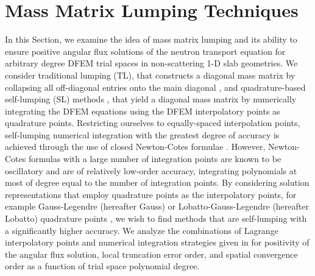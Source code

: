 \section{Mass Matrix Lumping Techniques}

In this Section, we examine the idea of mass matrix lumping and its ability to ensure positive angular flux solutions of the neutron transport equation for arbitrary degree DFEM trial spaces in non-scattering 1-D slab geometries.  
We consider traditional lumping (TL), that constructs a diagonal mass matrix by collapsing all off-diagonal entries onto the main diagonal \cite{adams}, and quadrature-based self-lumping (SL) methods \cite{raviart}, that yield a diagonal mass matrix by numerically integrating the DFEM equations using the DFEM interpolatory points as quadrature points.  
Restricting ourselves to equally-spaced interpolation points, self-lumping numerical integration with the greatest degree of accuracy is achieved through the use of closed Newton-Cotes formulae \cite{abramowitz}.  
However, Newton-Cotes formulas with a large number of integration points are known to be oscillatory and are of relatively low-order accuracy, integrating polynomials at most of degree equal to the number of integration points.
By considering solution representations that employ quadrature points as the interpolatory points, for example Gauss-Legendre (hereafter Gauss) or Lobatto-Gauss-Legendre (hereafter Lobatto) quadrature points \cite{abramowitz}, we wish to find methods that are self-lumping with a significantly higher accuracy.
We analyze the combinations of Lagrange interpolatory points and numerical integration strategies given in 
for positivity of the angular flux solution, local truncation error order, and spatial convergence order as a function of 
trial space polynomial degree.
